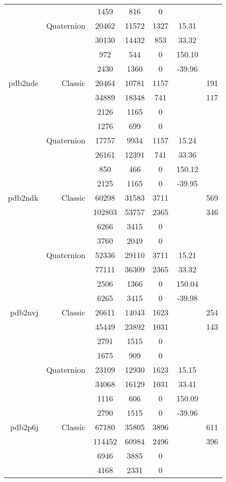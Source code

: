 \begin{xltabular}{\textwidth}{r|rcccSc}
& & 1459 & 816 & 0 & & \\
& Quaternion & 20462 & 11572 & 1327 & 15.31 & \\
& & 30130 & 14432 & 853 & 33.32 & \\
& & 972 & 544 & 0 & 150.10 & \\
& & 2430 & 1360 & 0 & -39.96 & \\ \addlinespace
pdb2nde & Classic & 20464 & 10781 & 1157 & & 191 \\
& & 34889 & 18348 & 741 & & 117 \\
& & 2126 & 1165 & 0 & & \\
& & 1276 & 699 & 0 & & \\
& Quaternion & 17757 & 9934 & 1157 & 15.24 & \\
& & 26161 & 12391 & 741 & 33.36 & \\
& & 850 & 466 & 0 & 150.12 & \\
& & 2125 & 1165 & 0 & -39.95 & \\ \addlinespace
pdb2ndk & Classic & 60298 & 31583 & 3711 & & 569 \\
& & 102803 & 53757 & 2365 & & 346 \\
& & 6266 & 3415 & 0 & & \\
& & 3760 & 2049 & 0 & & \\
& Quaternion & 52336 & 29110 & 3711 & 15.21 & \\
& & 77111 & 36309 & 2365 & 33.32 & \\
& & 2506 & 1366 & 0 & 150.04 & \\
& & 6265 & 3415 & 0 & -39.98 & \\ \addlinespace
pdb2nvj & Classic & 26611 & 14043 & 1623 & & 254 \\
& & 45449 & 23892 & 1031 & & 143 \\
& & 2791 & 1515 & 0 & & \\
& & 1675 & 909 & 0 & & \\
& Quaternion & 23109 & 12930 & 1623 & 15.15 & \\
& & 34068 & 16129 & 1031 & 33.41 & \\
& & 1116 & 606 & 0 & 150.09 & \\
& & 2790 & 1515 & 0 & -39.96 & \\ \addlinespace
pdb2p6j & Classic & 67180 & 35805 & 3896 & & 611 \\
& & 114452 & 60984 & 2496 & & 396 \\
& & 6946 & 3885 & 0 & & \\
& & 4168 & 2331 & 0 & & \\

\end{xltabular}
